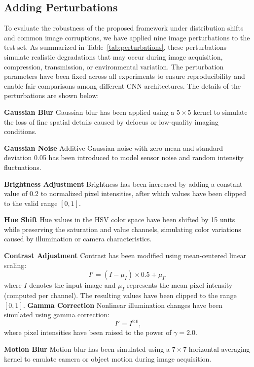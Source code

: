 \documentclass[a4paper,fleqn]{cas-dc}
\begin{document}
\subsection{Adding Perturbations}

To evaluate the robustness of the proposed framework under distribution shifts and common image corruptions, we have applied nine image perturbations to the test set. As summarized in Table~\ref{tab:perturbations}, these perturbations simulate realistic degradations that may occur during image acquisition, compression, transmission, or environmental variation. The perturbation parameters have been fixed across all experiments to ensure reproducibility and enable fair comparisons among different CNN architectures. The details of the perturbations are shown below:



\noindent\textbf{Gaussian Blur}
Gaussian blur has been applied using a $5 \times 5$ kernel to simulate the loss of fine spatial details caused by defocus or low-quality imaging conditions.

\noindent\textbf{Gaussian Noise}
Additive Gaussian noise with zero mean and standard deviation 0.05 has been introduced to model sensor noise and random intensity fluctuations.

\noindent\textbf{Brightness Adjustment}
Brightness has been increased by adding a constant value of 0.2 to normalized pixel intensities, after which values have been clipped to the valid range $[0,1]$.

\noindent\textbf{Hue Shift}
Hue values in the HSV color space have been shifted by 15 units while preserving the saturation and value channels, simulating color variations caused by illumination or camera characteristics.

\noindent\textbf{Contrast Adjustment}
Contrast has been modified using mean-centered linear scaling:
\[
I' = (I - \mu_I)\times 0.5 + \mu_I,
\]
where $I$ denotes the input image and $\mu_I$ represents the mean pixel intensity (computed per channel). The resulting values have been clipped to the range $[0,1]$.
\noindent\textbf{Gamma Correction}
Nonlinear illumination changes have been simulated using gamma correction:
\[
I' = I^{2.0},
\]
where pixel intensities have been raised to the power of $\gamma = 2.0$.

\noindent\textbf{Motion Blur}
Motion blur has been simulated using a $7 \times 7$ horizontal averaging kernel to emulate camera or object motion during image acquisition.
\end{document}
